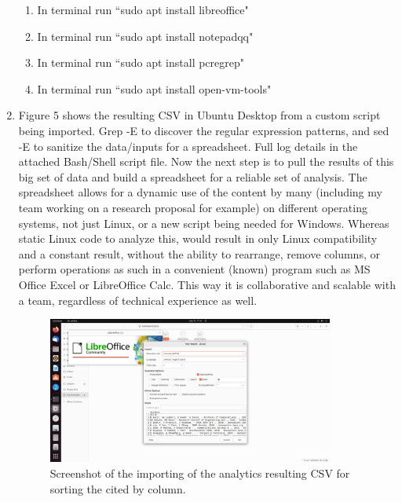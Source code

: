 \documentclass{article}
\begin{document}
\begin{enumerate}
\begin{enumerate}
                \item In terminal run ``sudo apt install libreoffice"
                \item In terminal run ``sudo apt install notepadqq"
                \item In terminal run ``sudo apt install pcregrep"
                \item In terminal run ``sudo apt install open-vm-tools"
                \end{enumerate}
            \item Figure 5 shows the resulting CSV in Ubuntu Desktop from a custom script being imported. Grep -E to discover the regular expression patterns, and sed -E to sanitize the data/inputs for a spreadsheet. Full log details in the attached Bash/Shell script file. Now the next step is to pull the results of this big set of data and build a spreadsheet for a reliable set of analysis. The spreadsheet allows for a dynamic use of the content by many (including my team working on a research proposal for example) on different operating systems, not just Linux, or a new script being needed for Windows. Whereas static Linux code to analyze this, would result in only Linux compatibility and a constant result, without the ability to rearrange, remove columns, or perform operations as such in a convenient (known) program such as MS Office Excel or LibreOffice Calc. This way it is collaborative and scalable with a team, regardless of technical experience as well.
                \begin{figure}[ht!] %
                \centering
                \caption{\label{fig:TableOfContentsSnippet.png}Screenshot of the importing of the analytics resulting CSV for sorting the cited by column.}
                \includegraphics[width=0.89\textwidth, height=0.5\textwidth]{2023-09-10 17 31 03.png}

\end{figure}
\end{enumerate}
\end{document}
